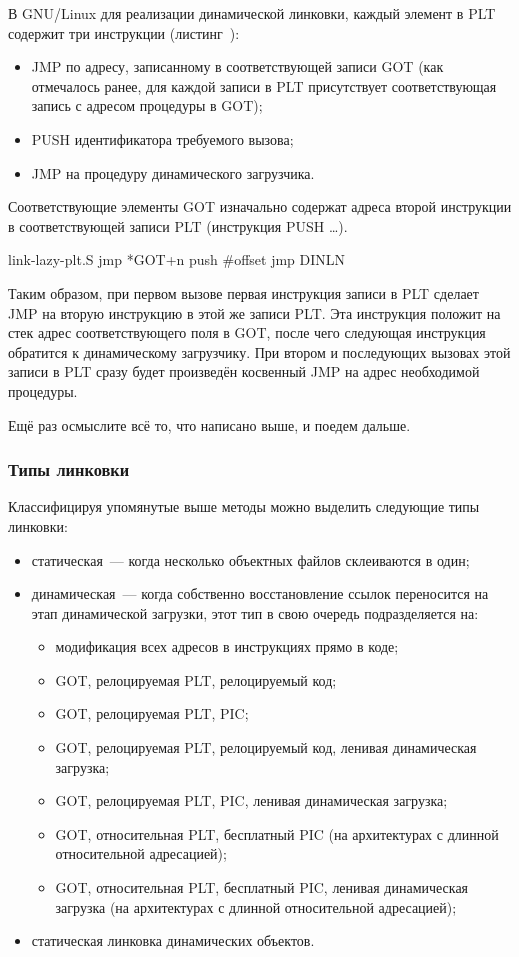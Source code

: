 В GNU/Linux для реализации динамической линковки, каждый элемент в PLT содержит три инструкции (листинг~):
\begin{itemize}
    \item JMP по адресу, записанному в соответствующей записи GOT (как отмечалось ранее, для каждой записи в PLT присутствует соответствующая запись с адресом процедуры в GOT);
    \item PUSH идентификатора требуемого вызова;
    \item JMP на процедуру динамического загрузчика.
\end{itemize}
Соответствующие элементы GOT изначально содержат адреса второй инструкции в соответствующей записи PLT (инструкция PUSH \dots).

\begin{asmcode}{link-lazy-plt.S}
jmp *GOT+n
push #offset
jmp DINLN
\end{asmcode}

Таким образом, при первом вызове первая инструкция записи в PLT сделает JMP на вторую инструкцию в этой же записи PLT.
Эта инструкция положит на стек адрес соответствующего поля в GOT, после чего следующая инструкция обратится к динамическому загрузчику.
При втором и последующих вызовах этой записи в PLT сразу будет произведён косвенный JMP на адрес необходимой процедуры.

Ещё раз осмыслите всё то, что написано выше, и поедем дальше.

\subsubsection{Типы линковки}
Классифицируя упомянутые выше методы можно выделить следующие типы линковки:
\begin{itemize}
    \item статическая~--- когда несколько объектных файлов склеиваются в один;
    \item динамическая~--- когда собственно восстановление ссылок переносится на этап динамической загрузки, этот тип в свою очередь подразделяется на:
        \begin{itemize}
            \item модификация всех адресов в инструкциях прямо в коде;
            \item GOT, релоцируемая PLT, релоцируемый код;
            \item GOT, релоцируемая PLT, PIC;
            \item GOT, релоцируемая PLT, релоцируемый код, ленивая динамическая загрузка;
            \item GOT, релоцируемая PLT, PIC, ленивая динамическая загрузка;
            \item GOT, относительная PLT, бесплатный PIC (на архитектурах с длинной относительной адресацией);
            \item GOT, относительная PLT, бесплатный PIC, ленивая динамическая загрузка (на архитектурах с длинной относительной адресацией);
        \end{itemize}
    \item статическая линковка динамических объектов.
\end{itemize}

